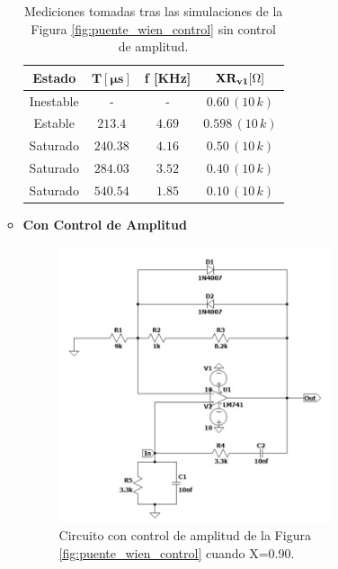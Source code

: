\begin{enumerate}
\begin{itemize}
                    \begin{table}[H]
                      \centering
                      \begin{tabular}{|c|c|c|c|}
                        \hline
                        \textbf{Estado} & $\mathbf{\text{T} [\mu s]}$ & \textbf{f [KHz]} & $\mathbf{XR_{v1} [\ohm]}$ \\
                        \hline
                        Inestable & - & - & $0.60\, (10 \, k)$ \\
                        \hline
                        Estable & $213.4$ & $4.69$ & $0.598\, (10 \, k)$ \\
                        \hline
                        Saturado & $240.38$ & $4.16$ & $0.50\, (10 \, k)$ \\
                        \hline
                        Saturado & $284.03$ & $3.52$ & $0.40\, (10 \, k)$ \\
                        \hline
                        Saturado & $540.54$ & $1.85$ & $0.10\, (10 \, k)$ \\
                        \hline
                      \end{tabular}
                      \caption{Mediciones tomadas tras las simulaciones de la Figura \ref{fig:puente_wien_control} sin control de amplitud.}
                      \label{tab:sim_puente_wien_sc}
                    \end{table}

                \item \textbf{Con Control de Amplitud} 

                     \begin{figure}[H]
                        \centering
                        \setcounter{figure}{9}
                        \includegraphics[width=8cm]{Imagenes/sim_cir_puente_wien_control0.png}
                        \caption{Circuito con control de amplitud de la Figura \ref{fig:puente_wien_control} cuando X=0.90.}
                        \label{fig:sim_cir_puente_wien_control0}
                    \end{figure}


\end{itemize}
\end{enumerate}
